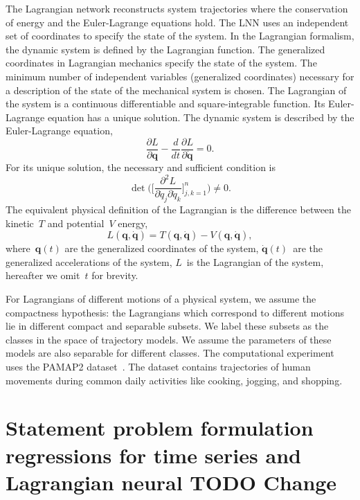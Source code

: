\documentclass[12pt]{paper}
\begin{document}
The Lagrangian network reconstructs system trajectories where the conservation of energy and the Euler-Lagrange equations hold. The LNN  uses an independent set of coordinates to specify the state of the system. In the Lagrangian formalism, the dynamic system is defined by the Lagrangian function.  The generalized coordinates in Lagrangian mechanics specify the state of the system. The minimum number of independent variables (generalized coordinates) necessary for a description of the state of the mechanical system is chosen. The Lagrangian of the system is a continuous differentiable and square-integrable function. Its Euler-Lagrange equation has a unique solution. 
The dynamic system is described by the Euler-Lagrange equation,
\begin{equation}
\frac{\partial L}{\partial\mathbf{q}}-\frac{d}{dt}\frac{\partial L}{\partial\dot{\mathbf{q}}}=0.
    \label{eq:euler_larange}
\end{equation}
For its unique solution, the necessary and sufficient condition is 
\begin{equation}
    \det\!\bigg(\big[\frac{\partial^{2} L}{\partial \dot{q}_{j}\partial \dot{q}_{k}}\big]_{j,k=1}^{n}\bigg) \neq 0.
\end{equation}
The equivalent physical definition of the Lagrangian is the difference between the kinetic~$T$ and potential~$V$ energy,
\begin{equation}
L\left(\mathbf{q},\dot{\mathbf{q}}\right) = T\left(\mathbf{q},\dot{\mathbf{q}}\right)- V\left(\mathbf{q},\dot{\mathbf{q}}\right), 
\label{eq:L=T-V}
\end{equation}
where~$\mathbf{q}(t)$ are the generalized coordinates of the system, $\dot{\mathbf{q}}(t)$~are the generalized accelerations of the system, $L$~is the Lagrangian of the system, hereafter we omit~$t$ for brevity.

For Lagrangians of different motions of a physical system, we assume the compactness hypothesis: the Lagrangians which correspond to different motions lie in different compact and separable subsets. We label these subsets as the classes in the space of trajectory models. We assume the parameters of these models are also separable for different classes. The computational experiment uses the PAMAP2 dataset~\cite{TODO}. The dataset contains trajectories of human movements during common daily activities like cooking, jogging, and shopping.

\section{Statement problem formulation regressions for time series and Lagrangian neural TODO Change}
\end{document}

